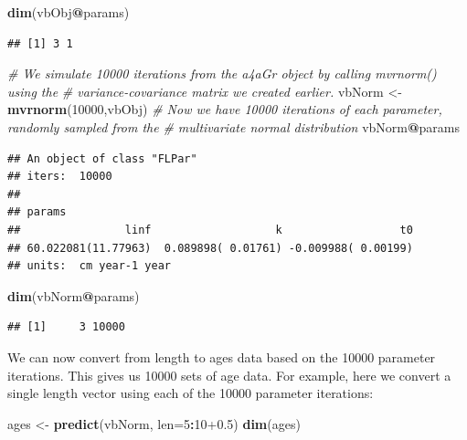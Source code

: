 \documentclass[
]{book}
\newenvironment{Shaded}{\begin{snugshade}}{\end{snugshade}}
\newcommand{\AttributeTok}[1]{\textcolor[rgb]{0.13,0.29,0.53}{#1}}
\newcommand{\CommentTok}[1]{\textcolor[rgb]{0.56,0.35,0.01}{\textit{#1}}}
\newcommand{\DecValTok}[1]{\textcolor[rgb]{0.00,0.00,0.81}{#1}}
\newcommand{\FloatTok}[1]{\textcolor[rgb]{0.00,0.00,0.81}{#1}}
\newcommand{\FunctionTok}[1]{\textcolor[rgb]{0.13,0.29,0.53}{\textbf{#1}}}
\newcommand{\NormalTok}[1]{#1}
\newcommand{\OtherTok}[1]{\textcolor[rgb]{0.56,0.35,0.01}{#1}}
\newcommand{\SpecialCharTok}[1]{\textcolor[rgb]{0.81,0.36,0.00}{\textbf{#1}}}
\begin{document}
\begin{Shaded}
\begin{Highlighting}[]
\FunctionTok{dim}\NormalTok{(vbObj}\SpecialCharTok{@}\NormalTok{params)}
\end{Highlighting}
\end{Shaded}

\begin{verbatim}
## [1] 3 1
\end{verbatim}

\begin{Shaded}
\begin{Highlighting}[]
\CommentTok{\# We simulate 10000 iterations from the a4aGr object by calling mvrnorm() using the }
\CommentTok{\# variance{-}covariance matrix we created earlier.}
\NormalTok{vbNorm }\OtherTok{\textless{}{-}} \FunctionTok{mvrnorm}\NormalTok{(}\DecValTok{10000}\NormalTok{,vbObj)}
\CommentTok{\# Now we have 10000 iterations of each parameter, randomly sampled from the }
\CommentTok{\# multivariate normal distribution}
\NormalTok{vbNorm}\SpecialCharTok{@}\NormalTok{params}
\end{Highlighting}
\end{Shaded}

\begin{verbatim}
## An object of class "FLPar"
## iters:  10000 
## 
## params
##                linf                   k                  t0 
## 60.022081(11.77963)  0.089898( 0.01761) -0.009988( 0.00199) 
## units:  cm year-1 year
\end{verbatim}

\begin{Shaded}
\begin{Highlighting}[]
\FunctionTok{dim}\NormalTok{(vbNorm}\SpecialCharTok{@}\NormalTok{params)}
\end{Highlighting}
\end{Shaded}

\begin{verbatim}
## [1]     3 10000
\end{verbatim}

We can now convert from length to ages data based on the 10000 parameter iterations. This gives us 10000 sets of age data. For example, here we convert a single length vector using each of the 10000 parameter iterations:

\begin{Shaded}
\begin{Highlighting}[]
\NormalTok{ages }\OtherTok{\textless{}{-}} \FunctionTok{predict}\NormalTok{(vbNorm, }\AttributeTok{len=}\DecValTok{5}\SpecialCharTok{:}\DecValTok{10}\FloatTok{+0.5}\NormalTok{)}
\FunctionTok{dim}\NormalTok{(ages)}
\end{Highlighting}
\end{Shaded}
\end{document}
